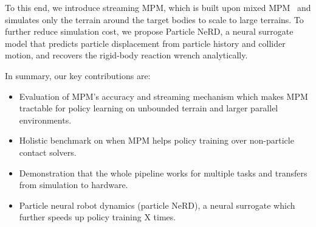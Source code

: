 To this end, we introduce streaming MPM, which is built upon mixed MPM~\cite{daviet2026mixedmpm} and simulates only the terrain around the target bodies to scale to large terrains.
To further reduce simulation cost, we propose Particle NeRD, a neural surrogate model that predicts particle displacement from particle history and collider motion, and recovers the rigid-body reaction wrench analytically.

In summary, our key contributions are: 


\begin{itemize}
    \item Evaluation of MPM's accuracy and streaming mechanism which makes MPM tractable for policy learning on unbounded terrain and larger parallel environments.
    \item Holistic benchmark on when MPM helps policy training over non-particle contact solvers.
    \item Demonstration that the whole pipeline works for multiple tasks and transfers from simulation to hardware.
    \item Particle neural robot dynamics (particle NeRD), a neural surrogate which further speeds up policy training X times.
\end{itemize}
